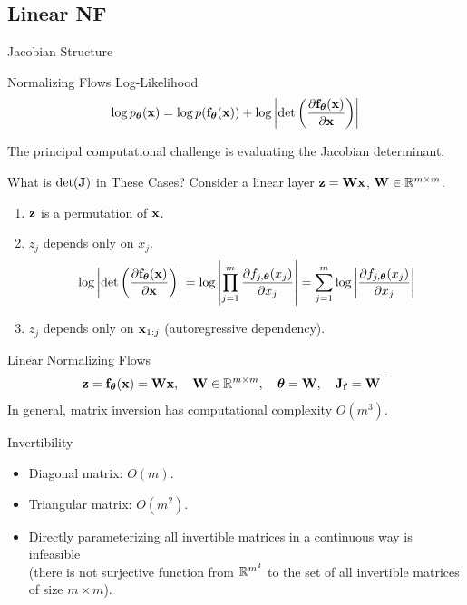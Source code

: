 \documentclass{beamer}
\renewcommand{\eqpause}{}
\renewcommand{\nextonslide}[1]{#1}
\begin{document}
\subsection{Linear NF}
\begin{frame}{Jacobian Structure}
	\begin{block}{Normalizing Flows Log-Likelihood}
		\[
			\log p_{\boldsymbol{\theta}}(\mathbf{x}) = \log p(\mathbf{f}_{\boldsymbol{\theta}}(\mathbf{x})) + \log \left|\det \left( \frac{\partial \mathbf{f}_{\boldsymbol{\theta}}(\mathbf{x})}{\partial \mathbf{x}} \right) \right|
		\]
	\end{block}
	The principal computational challenge is evaluating the Jacobian determinant.
    \eqpause
	\begin{block}{What is $\det(\mathbf{J})$ in These Cases?}
		Consider a linear layer $\mathbf{z} = \mathbf{W} \mathbf{x}$, $\mathbf{W} \in \mathbb{R}^{m \times m}$.
		\begin{enumerate}
			\item $\mathbf{z}$ is a permutation of $\mathbf{x}$.
			    \eqpause
			\item $z_j$ depends only on $x_j$. 
			\vspace{-0.3cm}
			\[
				\nextonslide{\log \left|\det \left( \frac{\partial \bff_{\btheta}(\bx)}{\partial \bx} \right) \right| = \log \left| \prod_{j=1}^m \frac{\partial f_{j, \btheta}(x_j)}{\partial x_j} \right| = \sum_{j=1}^m \log \left|  \frac{\partial f_{j, \btheta}(x_j)}{\partial x_j} \right|}
			\]
			\vspace{-0.3cm}
			\eqpause
			\item $z_j$ depends only on $\mathbf{x}_{1:j}$ (autoregressive dependency).
		\end{enumerate}
	\end{block}
\end{frame}
\begin{frame}{Linear Normalizing Flows}
	\[
		\mathbf{z} = \mathbf{f}_{\boldsymbol{\theta}}(\mathbf{x}) = \mathbf{W} \mathbf{x}, \quad \mathbf{W} \in \mathbb{R}^{m \times m}, \quad \boldsymbol{\theta} = \mathbf{W}, \quad \mathbf{J}_{\mathbf{f}} = \mathbf{W}^\top
	\]
	In general, matrix inversion has computational complexity $O(m^3)$.
    \eqpause
	\begin{block}{Invertibility}
		\begin{itemize}
			\item Diagonal matrix: $O(m)$.
			\item Triangular matrix: $O(m^2)$.
			\item Directly parameterizing all invertible matrices in a continuous way is infeasible \\ (there is not surjective function from $\mathbb{R}^{m^2}$ to the set of all invertible matrices of size $m \times m$).
		\end{itemize}
	\end{block}
\end{frame}
\end{document}
